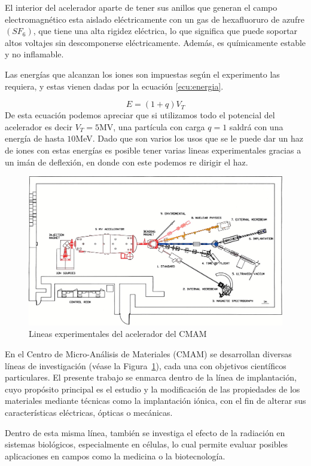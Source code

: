 \documentclass[onecolumn,12pt]{article} %
\begin{document}
El interior del acelerador aparte de tener sus anillos que generan el campo electromagnético  esta aislado eléctricamente con un gas de hexafluoruro de azufre $(SF_6)$, que tiene una alta rigidez eléctrica, lo que significa que puede soportar altos voltajes sin descomponerse eléctricamente. Además, es químicamente estable y no inflamable.

Las energías que alcanzan los iones son impuestas según el experimento las requiera, y estas vienen dadas por la ecuación \ref{ecu:energia}. 

\begin{equation}
    E=(1+q)V_T
    \label{ecu:energia}
\end{equation}
De esta ecuación podemos apreciar que si utilizamos todo el potencial  del acelerador es decir $V_T= 5$MV, una partícula con carga $q=1$ saldrá con una energía de hasta $10 $MeV. Dado que son varios los usos que se le puede dar un haz de iones con estas energías es posible tener varias lineas experimentales  gracias a un imán de deflexión, en donde  con este  podemos re dirigir el haz. 

\begin{figure}[H]
    \centering
    \includegraphics[width=0.5\linewidth]{img_intro/EsquemaAcelerador.pdf}
    \caption{Lineas experimentales del acelerador del CMAM}
    \label{fig:lieasExp}
\end{figure}
En el Centro de Micro-Análisis de Materiales (CMAM) se desarrollan diversas líneas de investigación (véase la Figura~\ref{fig:lieasExp}), cada una con objetivos científicos particulares. El presente trabajo se enmarca dentro de la línea de implantación, cuyo propósito principal es el estudio y la modificación de las propiedades de los materiales mediante técnicas como la implantación iónica, con el fin de alterar sus características eléctricas, ópticas o mecánicas.

Dentro de esta misma línea, también se investiga el efecto de la radiación en sistemas biológicos, especialmente en células, lo cual permite evaluar posibles aplicaciones en campos como la medicina o la biotecnología.
\end{document}
